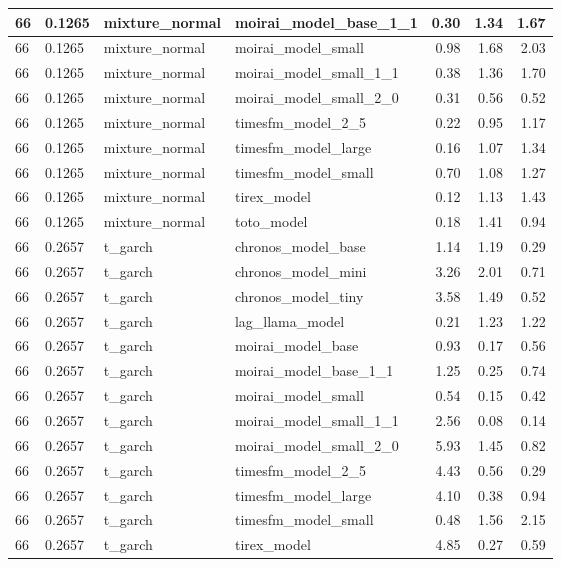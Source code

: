 {\begin{tabular}{llllrrr}
\midrule
66 & 0.1265 & mixture\_normal & moirai\_model\_base\_1\_1 & 0.30 & 1.34 & 1.67 \\
\midrule
66 & 0.1265 & mixture\_normal & moirai\_model\_small & 0.98 & 1.68 & 2.03 \\
\midrule
66 & 0.1265 & mixture\_normal & moirai\_model\_small\_1\_1 & 0.38 & 1.36 & 1.70 \\
\midrule
66 & 0.1265 & mixture\_normal & moirai\_model\_small\_2\_0 & 0.31 & 0.56 & 0.52 \\
\midrule
66 & 0.1265 & mixture\_normal & timesfm\_model\_2\_5 & 0.22 & 0.95 & 1.17 \\
\midrule
66 & 0.1265 & mixture\_normal & timesfm\_model\_large & 0.16 & 1.07 & 1.34 \\
\midrule
66 & 0.1265 & mixture\_normal & timesfm\_model\_small & 0.70 & 1.08 & 1.27 \\
\midrule
66 & 0.1265 & mixture\_normal & tirex\_model & 0.12 & 1.13 & 1.43 \\
\midrule
66 & 0.1265 & mixture\_normal & toto\_model & 0.18 & 1.41 & 0.94 \\
\midrule
66 & 0.2657 & t\_garch & chronos\_model\_base & 1.14 & 1.19 & 0.29 \\
\midrule
66 & 0.2657 & t\_garch & chronos\_model\_mini & 3.26 & 2.01 & 0.71 \\
\midrule
66 & 0.2657 & t\_garch & chronos\_model\_tiny & 3.58 & 1.49 & 0.52 \\
\midrule
66 & 0.2657 & t\_garch & lag\_llama\_model & 0.21 & 1.23 & 1.22 \\
\midrule
66 & 0.2657 & t\_garch & moirai\_model\_base & 0.93 & 0.17 & 0.56 \\
\midrule
66 & 0.2657 & t\_garch & moirai\_model\_base\_1\_1 & 1.25 & 0.25 & 0.74 \\
\midrule
66 & 0.2657 & t\_garch & moirai\_model\_small & 0.54 & 0.15 & 0.42 \\
\midrule
66 & 0.2657 & t\_garch & moirai\_model\_small\_1\_1 & 2.56 & 0.08 & 0.14 \\
\midrule
66 & 0.2657 & t\_garch & moirai\_model\_small\_2\_0 & 5.93 & 1.45 & 0.82 \\
\midrule
66 & 0.2657 & t\_garch & timesfm\_model\_2\_5 & 4.43 & 0.56 & 0.29 \\
\midrule
66 & 0.2657 & t\_garch & timesfm\_model\_large & 4.10 & 0.38 & 0.94 \\
\midrule
66 & 0.2657 & t\_garch & timesfm\_model\_small & 0.48 & 1.56 & 2.15 \\
\midrule
66 & 0.2657 & t\_garch & tirex\_model & 4.85 & 0.27 & 0.59 \\

\end{tabular}}
